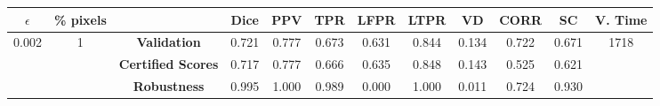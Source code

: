 \begin{longtable}{ c  c | c | c  c  c  c  c  c  c c c}
\toprule \textbf{$\epsilon$} & \textbf{\% pixels} & & \textbf{Dice} & \textbf{PPV} & \textbf{TPR} & \textbf{LFPR} & \textbf{LTPR} & \textbf{VD} & \textbf{CORR} & \textbf{SC} & \textbf{V. Time} \\
\midrule 
\multirow{3}{*}{0.002}  & \multirow{3}{*}{1} &\textbf{Validation} & 0.721 & 0.777 & 0.673 & 0.631 & 0.844 & 0.134 & 0.722 & 0.671 & \multirow{3}{*}{1718} \\
 & & \textbf{Certified Scores} & 0.717 & 0.777 & 0.666 & 0.635 & 0.848 & 0.143 & 0.525 & 0.621 & \\
& & \textbf{Robustness} & 0.995 & 1.000 & 0.989 & 0.000 & 1.000 & 0.011 & 0.724 & 0.930 & \\
\end{longtable}